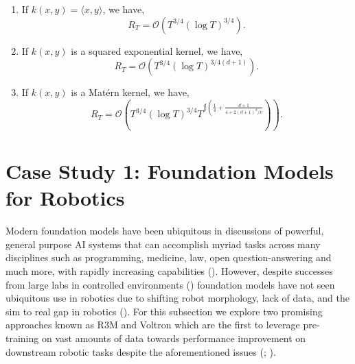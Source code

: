 \documentclass[
  letterpaper,
  numbers=noenddot,
  DIV=11]{scrreprt}
\theoremstyle{plain}
\theoremstyle{definition}
\theoremstyle{remark}
\begin{document}
\begin{enumerate}
\def\labelenumi{\arabic{enumi}.}
\item
  If \(k(x, y)=\langle x, y\rangle\), we have,
  \[R_T=\mathcal{O}\left(T^{3 / 4}(\log T)^{3 / 4}\right) .\]
\item
  If \(k(x, y)\) is a squared exponential kernel, we have,
  \[R_T=\mathcal{O}\left(T^{3 / 4}(\log T)^{3 / 4(d+1)}\right) .\]
\item
  If \(k(x, y)\) is a Matérn kernel, we have,
  \[\left.R_T=\mathcal{O}\left(T^{3 / 4}(\log T)^{3 / 4} T^{\frac{d}{\nu}\left(\frac{1}{4}+\frac{d+1}{4+2(d+1)^d / \nu}\right.}\right)\right).\]
\end{enumerate}

\section{Case Study 1: Foundation Models for
Robotics}\label{case-study-1-foundation-models-for-robotics}

Modern foundation models have been ubiquitous in discussions of
powerful, general purpose AI systems that can accomplish myriad tasks
across many disciplines such as programming, medicine, law, open
question-answering and much more, with rapidly increasing capabilities
().
However, despite successes from large labs in controlled environments
() foundation models
have not seen ubiquitous use in robotics due to shifting robot
morphology, lack of data, and the sim to real gap in robotics
(). For this
subsection we explore two promising approaches known as R3M and Voltron
which are the first to leverage pre-training on vast amounts of data
towards performance improvement on downstream robotic tasks despite the
aforementioned issues (;
).
\end{document}
